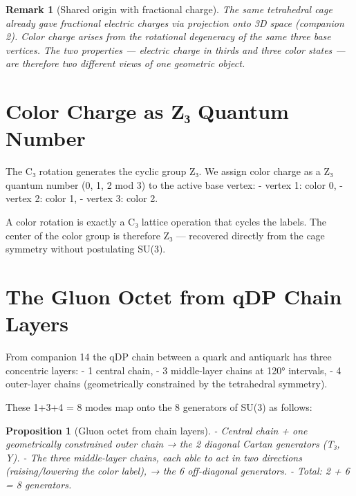 \documentclass[12pt]{article}
\newtheorem{proposition}[theorem]{Proposition}
\newtheorem{remark}[theorem]{Remark}
\begin{document}
\begin{remark}[Shared origin with fractional charge]
The same tetrahedral cage already gave fractional electric charges via projection onto 3D space (companion 2). Color charge arises from the rotational degeneracy of the same three base vertices. The two properties — electric charge in thirds and three color states — are therefore two different views of one geometric object.
\end{remark}

\section{Color Charge as Z₃ Quantum Number}

The C₃ rotation generates the cyclic group Z₃. We assign color charge as a Z₃ quantum number (0, 1, 2 mod 3) to the active base vertex:
- vertex 1: color 0,
- vertex 2: color 1,
- vertex 3: color 2.

A color rotation is exactly a C₃ lattice operation that cycles the labels. The center of the color group is therefore Z₃ — recovered directly from the cage symmetry without postulating SU(3).

\section{The Gluon Octet from qDP Chain Layers}

From companion 14 the qDP chain between a quark and antiquark has three concentric layers:
- 1 central chain,
- 3 middle-layer chains at 120° intervals,
- 4 outer-layer chains (geometrically constrained by the tetrahedral symmetry).

These 1+3+4 = 8 modes map onto the 8 generators of SU(3) as follows:

\begin{proposition}[Gluon octet from chain layers]
- Central chain + one geometrically constrained outer chain → the 2 diagonal Cartan generators (T₃, Y).
- The three middle-layer chains, each able to act in two directions (raising/lowering the color label), → the 6 off-diagonal generators.
- Total: 2 + 6 = 8 generators.
\end{proposition}
\end{document}
